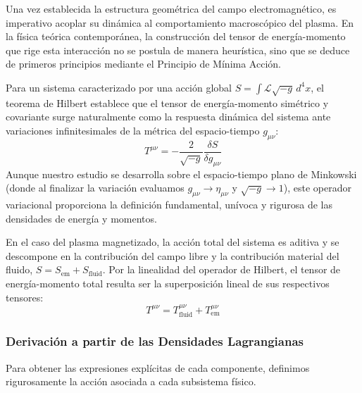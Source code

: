 \primerparrafo Una vez establecida la estructura geométrica del campo electromagnético, es imperativo acoplar su dinámica al comportamiento macroscópico del plasma. En la física teórica contemporánea, la construcción del tensor de energía-momento que rige esta interacción no se postula de manera heurística, sino que se deduce de primeros principios mediante el Principio de Mínima Acción.

Para un sistema caracterizado por una acción global $S = \int \mathcal{L} \sqrt{-g} \, d^4x$, el teorema de Hilbert establece que el tensor de energía-momento simétrico y covariante surge naturalmente como la respuesta dinámica del sistema ante variaciones infinitesimales de la métrica del espacio-tiempo $g_{\mu\nu}$:
\begin{equation}
    T^{\mu\nu} = -\frac{2}{\sqrt{-g}} \frac{\delta S}{\delta g_{\mu\nu}}
\end{equation}
Aunque nuestro estudio se desarrolla sobre el espacio-tiempo plano de Minkowski (donde al finalizar la variación evaluamos $g_{\mu\nu} \to \eta_{\mu\nu}$ y $\sqrt{-g} \to 1$), este operador variacional proporciona la definición fundamental, unívoca y rigurosa de las densidades de energía y momentos. 

En el caso del plasma magnetizado, la acción total del sistema es aditiva y se descompone en la contribución del campo libre y la contribución material del fluido, $S = S_{\text{em}} + S_{\text{fluid}}$. Por la linealidad del operador de Hilbert, el tensor de energía-momento total resulta ser la superposición lineal de sus respectivos tensores:
\begin{equation}
    T^{\mu\nu} = T^{\mu\nu}_{\text{fluid}} + T^{\mu\nu}_{\text{em}}
\end{equation}

\subsubsection{Derivación a partir de las Densidades Lagrangianas}

\primerparrafo Para obtener las expresiones explícitas de cada componente, definimos rigurosamente la acción asociada a cada subsistema físico.

